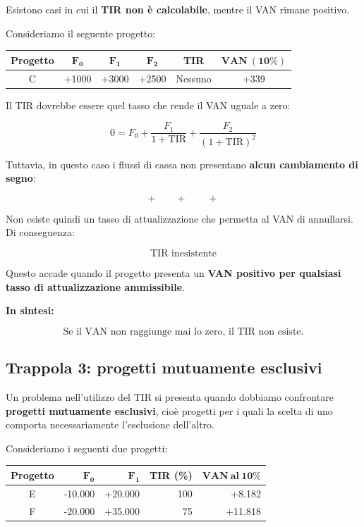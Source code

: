 \noindent Esistono casi in cui il \textbf{TIR non è calcolabile}, mentre il VAN
rimane positivo.

\noindent Consideriamo il seguente progetto:

\begin{center}
\begin{tabular}{c|ccc|c|c}
\textbf{Progetto} & $\mathbf{F_0}$ & $\mathbf{F_1}$ & $\mathbf{F_2}$
& \textbf{TIR} & $\mathbf{VAN\ (10\%)}$ \\
\hline
C & +1000 & +3000 & +2500 & Nessuno & +339
\end{tabular}
\end{center}

\noindent Il TIR dovrebbe essere quel tasso che rende il VAN uguale a zero:

\[
0 =
F_0
+ \frac{F_1}{1+\mathrm{TIR}}
+ \frac{F_2}{(1+\mathrm{TIR})^2}
\]

\noindent Tuttavia, in questo caso i flussi di cassa non presentano
\textbf{alcun cambiamento di segno}:

\[
+\qquad+\qquad+
\]

\noindent Non esiste quindi un tasso di attualizzazione che permetta al VAN
di annullarsi. Di conseguenza:

\[
\boxed{\text{TIR inesistente}}
\]

\noindent Questo accade quando il progetto presenta un \textbf{VAN positivo
per qualsiasi tasso di attualizzazione ammissibile}.

\medskip

\noindent\textbf{In sintesi:}

\[
\boxed{
\text{Se il VAN non raggiunge mai lo zero, il TIR non esiste.}
}
\]
\subsection*{Trappola 3: progetti mutuamente esclusivi}

\noindent Un problema nell'utilizzo del TIR si presenta quando dobbiamo
confrontare \textbf{progetti mutuamente esclusivi}, cioè progetti per i quali
la scelta di uno comporta necessariamente l'esclusione dell'altro.

\noindent Consideriamo i seguenti due progetti:

\begin{center}
\begin{tabular}{c|rrrr}
\textbf{Progetto} & $\mathbf{F_0}$ & $\mathbf{F_1}$ &
\textbf{TIR (\%)} & $\mathbf{VAN\ al\ 10\%}$ \\
\hline
E & -10.000 & +20.000 & 100 & +8.182 \\
F & -20.000 & +35.000 & 75 & +11.818
\end{tabular}
\end{center}


